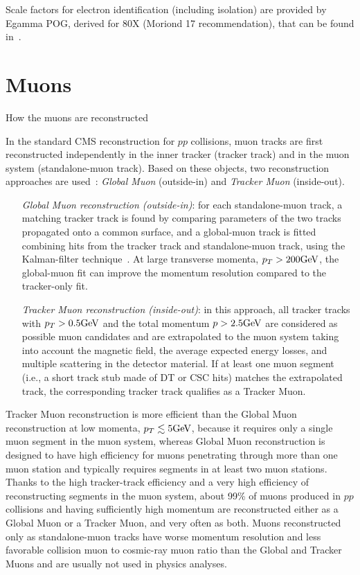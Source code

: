 Scale factors for electron identification (including isolation) are provided by Egamma POG, derived for 80X (Moriond 17 recommendation), that can be found in~\cite{EGammaPOG_ele_SF}.



\section{Muons}\label{ssec:muons}

{\color{red} How the muons are reconstructed}

In the standard CMS reconstruction for $pp$ collisions, muon tracks are first reconstructed independently in the inner tracker (tracker track) and in the muon system (standalone-muon track). Based on these objects, two reconstruction approaches are used~\cite{bib:CMS-PAPER-MUO-10-004}: \emph{Global Muon} (outside-in) and \emph{Tracker Muon} (inside-out).
\begin{itemize}
  \item[\emph{Global Muon reconstruction (outside-in)}:] for each standalone-muon track, a matching tracker track is found by comparing parameters of the two tracks propagated onto a common surface, and a global-muon track is fitted combining hits from the tracker track and standalone-muon track, using the Kalman-filter technique~\cite{bib:kalman}. At large transverse momenta, $p_T > 200 \text{GeV}$, the global-muon fit can improve the momentum resolution compared to the tracker-only fit.
  \item[\emph{Tracker Muon reconstruction (inside-out)}:] in this approach, all tracker tracks with $p_T > 0.5 \text{GeV}$ and the total momentum $p > 2.5 \text{GeV}$ are considered as possible muon candidates and are extrapolated to the muon system taking into account the magnetic field, the average expected energy losses, and multiple scattering in the detector material. If at least one muon segment (i.e., a short track stub made of DT or CSC hits) matches the extrapolated track, the corresponding tracker track qualifies as a Tracker Muon.
\end{itemize}

Tracker Muon reconstruction is more efficient than the Global Muon reconstruction at low momenta, $p_T \lesssim 5 \text{GeV}$, because it requires only a single muon segment in the muon system, whereas Global Muon reconstruction is designed to have high efficiency for muons penetrating through more than one muon station and typically requires segments in at least two muon stations. Thanks to the high tracker-track efficiency and a very high efficiency of reconstructing segments in the muon system, about 99\% of muons produced in $pp$ collisions and having sufficiently high momentum are reconstructed either as a Global Muon or a Tracker Muon, and very often as both. Muons reconstructed only as standalone-muon tracks have worse momentum resolution and less favorable collision muon to cosmic-ray muon ratio than the Global and Tracker Muons and are usually not used in physics analyses.

